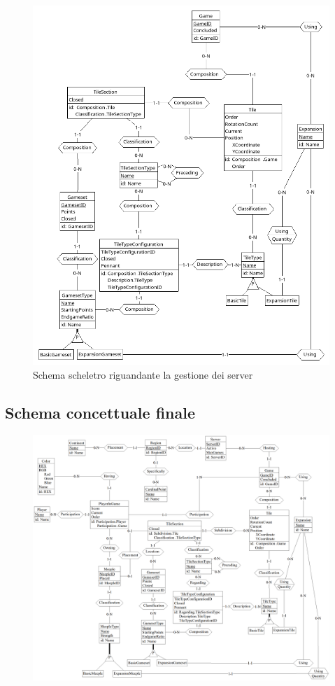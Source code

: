 \begin{figure}[hb]
    \centering\includegraphics[scale=0.24]{images/Progettazione/Concettuale/Scheletro3.png}
    \caption{Schema scheletro riguandante la gestione dei server}
\end{figure}

\subsection{Schema concettuale finale}
\clearpage
\begin{figure}[ht]
    \centerline{\includegraphics[scale=0.52]{images/Progettazione/Concettuale/modello.png}}
\end{figure}